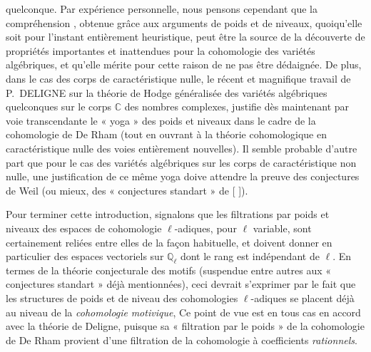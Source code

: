 \documentclass[11pt,a4paper]{article}
\begin{document}
quelconque. Par expérience personnelle, nous pensons cependant que la
compréhension , obtenue grâce aux arguments de poids et de niveaux, quoiqu'elle
soit pour l'instant entièrement heuristique, peut être la source de la
découverte de propriétés importantes et inattendues pour la cohomologie des
variétés algébriques, et qu'elle mérite pour cette raison de ne pas être
dédaignée. De plus, dans le cas des corps de caractéristique nulle,
 le récent et
magnifique travail de P.\ DELIGNE sur la théorie de Hodge généralisée
des variétés algébriques quelconques sur le corps $\mathbb{C}$ des nombres
complexes, justifie dès maintenant par voie transcendante le « yoga »
des poids et niveaux dans le cadre de la cohomologie de De Rham (tout en
ouvrant à la théorie cohomologique en caractéristique nulle
 des voies entièrement nouvelles). Il
 semble probable d'autre part que pour le cas des
 variétés algébriques sur les corps
de caractéristique non nulle, une justification de ce même yoga doive
attendre la  preuve des conjectures de Weil (ou
mieux, des « conjectures standart » de [ ]).

Pour  terminer cette introduction, signalons que les
filtrations par poids et niveaux des espaces de cohomologie $\ell$-adiques,
pour $\ell$ variable, sont certainement reliées entre elles de la façon
habituelle, et doivent donner  en particulier des
espaces vectoriels sur $\mathbb{Q}_{\ell}$ dont le rang est indépendant de
$\ell$. En termes de la théorie conjecturale des motifs (suspendue entre
autres aux « conjectures standart » déjà mentionnées), ceci devrait
s'exprimer par le fait que les structures de poids et de niveau des
cohomologies $\ell$-adiques se placent déjà  au niveau de
 la \emph{cohomologie}  \emph{motivique},
 Ce point de vue est en tous cas en accord avec
la théorie de Deligne,  puisque sa « filtration par le poids » de
la cohomologie de De Rham provient d'une filtration de la cohomologie à
coefficients \emph{rationnels}. 

\end{document}
